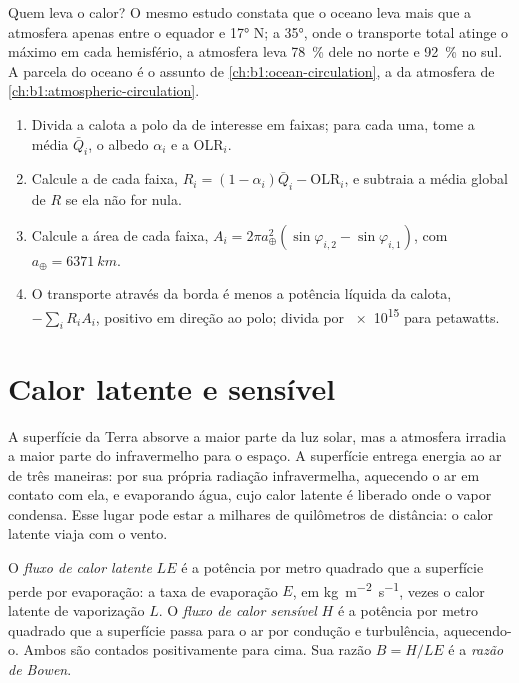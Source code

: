 Quem leva o calor? O mesmo estudo constata que o oceano leva mais que a atmosfera apenas entre o
equador e \ang{17} N; a \ang{35}, onde o transporte total atinge o máximo em cada hemisfério, a
atmosfera leva \qty{78}{\percent} dele no norte e \qty{92}{\percent} no sul. A parcela do oceano é o
assunto de \cref{ch:b1:ocean-circulation}, a da atmosfera de \cref{ch:b1:atmospheric-circulation}.

\begin{method}\label{met:b1:radiation-heat-transport:bands}
\begin{enumerate}
  \item Divida a calota a polo da  de interesse em faixas; para cada uma, tome a 
        média $\bar Q_i$, o albedo $\alpha_i$ e a OLR$_i$.
  \item Calcule a  de cada faixa, $R_i = (1 - \alpha_i)\bar Q_i -
        \text{OLR}_i$, e subtraia a média global de $R$ se ela não for nula.
  \item Calcule a área de cada faixa, $A_i = 2\pi a_\oplus^2(\sin\varphi_{i,2} -
        \sin\varphi_{i,1})$, com $a_\oplus = \qty{6371}{km}$.
  \item O transporte através da borda é menos a potência líquida da calota, $-\sum_i R_i A_i$,
        positivo em direção ao polo; divida por \num{e15} para petawatts.
\end{enumerate}
\end{method}

\section{Calor latente e sensível}\label{sec:b1:radiation-heat-transport:latent}

A superfície da Terra absorve a maior parte da luz solar, mas a atmosfera irradia a maior parte do
infravermelho para o espaço. A superfície entrega energia ao ar de três maneiras: por sua própria
radiação infravermelha, aquecendo o ar em contato com ela, e evaporando água, cujo calor latente é
liberado onde o vapor condensa. Esse lugar pode estar a milhares de quilômetros de distância: o
calor latente viaja com o vento.

\begin{definition}\label{def:b1:radiation-heat-transport:surface-fluxes}
O \emph{fluxo de calor latente} $LE$ é a potência por metro quadrado
que a superfície perde por evaporação: a taxa de evaporação $E$, em \unit{kg.m^{-2}.s^{-1}}, vezes
o calor latente de vaporização $L$. O \emph{fluxo de calor sensível}
$H$ é a potência por metro quadrado que a superfície passa para o ar por condução e turbulência,
aquecendo-o. Ambos são contados positivamente para cima. Sua razão $B = H/LE$ é a
\emph{razão de Bowen}.
\end{definition}

